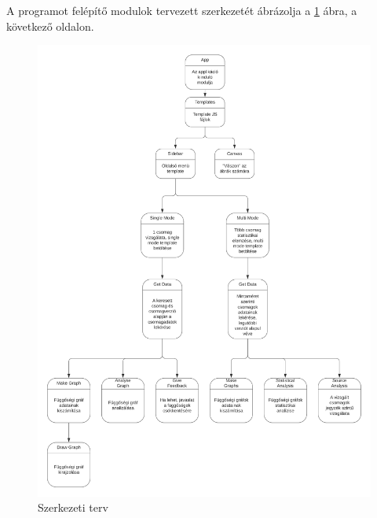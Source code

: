 \noindent A programot felépítő modulok tervezett szerkezetét ábrázolja a \ref{fig:struct_plan} ábra, a következő oldalon.

\begin{figure}[!h]
	\centering
	\includegraphics[scale=0.7]{images/struct_plan.png}
	\caption{Szerkezeti terv}
	\label{fig:struct_plan}
\end{figure}


 
